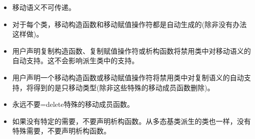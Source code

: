 \begin{itemize}
	\item 移动语义不可传递。
	\item 对于每个类，移动构造函数和移动赋值操作符都是自动生成的(除非没有办法这样做)。
	\item 用户声明复制构造函数、复制赋值操作符或析构函数将禁用类中对移动语义的自动支持。这不会影响派生类中的支持。
	\item 用户声明一个移动构造函数或移动赋值操作符将禁用类中对复制语义的自动支持，将得到的是只移动类型(除非这些特殊的移动成员函数删除)。
	\item 永远不要=delete特殊的移动成员函数。
	\item 如果没有特定的需要，不要声明析构函数。从多态基类派生的类也一样，没有特殊需要，不要声明析构函数。
\end{itemize}


\newpage